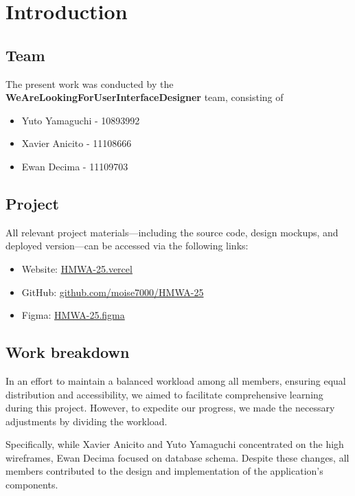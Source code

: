 \section{Introduction}
\subsection{Team}

The present work was conducted by the \textbf{WeAreLookingForUserInterfaceDesigner} team, consisting of
\begin{itemize}

    \item Yuto Yamaguchi - 10893992
    \item Xavier Anicito - 11108666 
    \item Ewan Decima - 11109703
\end{itemize}

\subsection{Project}
All relevant project materials—including the source code, design mockups, and deployed version—can be accessed via the following links:

\begin{itemize}
    \item Website: \href{https://hmwa-25-git-main-moise7000s-projects.vercel.app} {HMWA-25.vercel}
    \item GitHub: \href{https://github.com/moise7000/HMWA-25}{github.com/moise7000/HMWA-25}
    \item Figma: \href{https://www.figma.com/design/grXIBaO2j7GEfZ686v671W/Hyp-App?node-id=77-89&p=f&t=Xau7mkvIebVLoK7a-0}{HMWA-25.figma}
\end{itemize}

\subsection{Work breakdown}
In an effort to maintain a balanced workload among all members, ensuring equal distribution and accessibility,
we aimed to facilitate comprehensive learning during this project. However, to expedite our progress, we made
the necessary adjustments by dividing the workload.


Specifically, while Xavier Anicito and Yuto Yamaguchi  concentrated
on the high wireframes, Ewan Decima focused on database schema.
Despite these changes, all members contributed to the design and implementation of the application’s components.